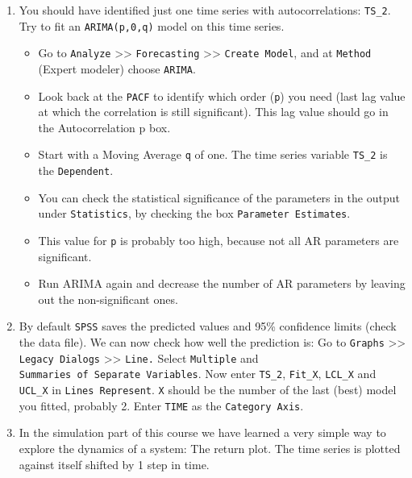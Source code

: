 \documentclass[]{book}
\providecommand{\tightlist}{%
  \setlength{\itemsep}{0pt}\setlength{\parskip}{0pt}}
\begin{document}
\begin{enumerate}
\def\labelenumi{\arabic{enumi}.}
\setcounter{enumi}{3}
\item
  You should have identified just one time series with autocorrelations:
  \texttt{TS\_2}. Try to fit an \texttt{ARIMA(p,0,q)} model on this time
  series.

  \begin{itemize}
  \tightlist
  \item
    Go to \texttt{Analyze} \textgreater{}\textgreater{}
    \texttt{Forecasting} \textgreater{}\textgreater{}
    \texttt{Create\ Model}, and at \texttt{Method} (Expert modeler)
    choose \texttt{ARIMA}.
  \item
    Look back at the \texttt{PACF} to identify which order (\texttt{p})
    you need (last lag value at which the correlation is still
    significant). This lag value should go in the Autocorrelation p box.
  \item
    Start with a Moving Average \texttt{q} of one. The time series
    variable \texttt{TS\_2} is the \texttt{Dependent}.
  \item
    You can check the statistical significance of the parameters in the
    output under \texttt{Statistics}, by checking the box
    \texttt{Parameter\ Estimates}.
  \item
    This value for \texttt{p} is probably too high, because not all AR
    parameters are significant.
  \item
    Run ARIMA again and decrease the number of AR parameters by leaving
    out the non-significant ones.
  \end{itemize}
\item
  By default \texttt{SPSS} saves the predicted values and 95\%
  confidence limits (check the data file). We can now check how well the
  prediction is: Go to \texttt{Graphs} \textgreater{}\textgreater{}
  \texttt{Legacy\ Dialogs} \textgreater{}\textgreater{} \texttt{Line.}
  Select \texttt{Multiple} and
  \texttt{Summaries\ of\ Separate\ Variables}. Now enter \texttt{TS\_2},
  \texttt{Fit\_X}, \texttt{LCL\_X} and \texttt{UCL\_X} in
  \texttt{Lines\ Represent}. \texttt{X} should be the number of the last
  (best) model you fitted, probably 2. Enter \texttt{TIME} as the
  \texttt{Category\ Axis}.
\item
  In the simulation part of this course we have learned a very simple
  way to explore the dynamics of a system: The return plot. The time
  series is plotted against itself shifted by 1 step in time.


\end{enumerate}
\end{document}
